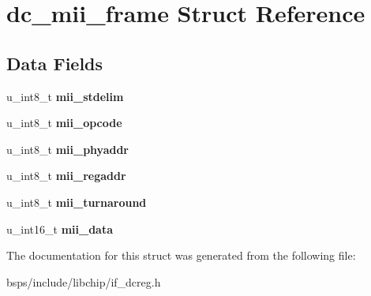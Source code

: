 \hypertarget{structdc__mii__frame}{}\section{dc\+\_\+mii\+\_\+frame Struct Reference}
\label{structdc__mii__frame}
\subsection*{Data Fields}
\begin{DoxyCompactItemize}
\item 
\mbox{\label{structdc__mii__frame_ac747c402ae06a4ab8827c38db2aec621}} 
u\+\_\+int8\+\_\+t {\bfseries mii\+\_\+stdelim}
\item 
\mbox{\label{structdc__mii__frame_a59922a23610298558ec317b1f80c4888}} 
u\+\_\+int8\+\_\+t {\bfseries mii\+\_\+opcode}
\item 
\mbox{\label{structdc__mii__frame_ad8adb8e7ef336626472d0ca5bdca7843}} 
u\+\_\+int8\+\_\+t {\bfseries mii\+\_\+phyaddr}
\item 
\mbox{\label{structdc__mii__frame_af4625126abf9cd9e773d011d16dc8cc9}} 
u\+\_\+int8\+\_\+t {\bfseries mii\+\_\+regaddr}
\item 
\mbox{\label{structdc__mii__frame_a2e7a9f59443170b9d88d91a35da7cc38}} 
u\+\_\+int8\+\_\+t {\bfseries mii\+\_\+turnaround}
\item 
\mbox{\label{structdc__mii__frame_a63318a75b11467a61adee3571ac938e9}} 
u\+\_\+int16\+\_\+t {\bfseries mii\+\_\+data}
\end{DoxyCompactItemize}


The documentation for this struct was generated from the following file\+:\begin{DoxyCompactItemize}
\item 
bsps/include/libchip/if\+\_\+dcreg.\+h\end{DoxyCompactItemize}
